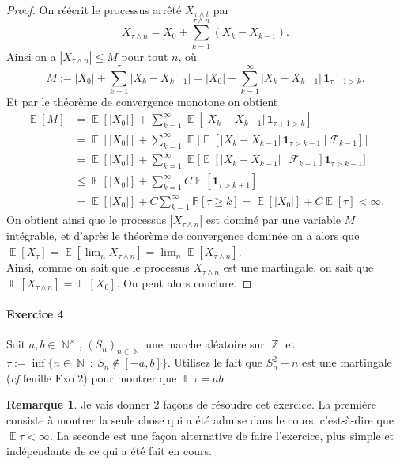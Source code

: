 \documentclass{article}
\theoremstyle{definition}
\newtheorem{rem}{Remarque}
\numberwithin{equation}{section}
\DeclareMathOperator{\Z}{\mathbb{Z}}
\DeclareMathOperator{\N}{\mathbb{N}}
\DeclareMathOperator{\E}{\mathbb{E}}
\begin{document}
\begin{proof}
On réécrit le processus arrêté $X_{\tau\wedge t}$ par 
$$X_{\tau\wedge n} = X_0 + \sum_{k=1}^{\tau\wedge n} (X_k-X_{k-1}).$$
Ainsi on a $|X_{\tau\wedge n}|\leq M$ pour tout $n$, où 
$$M:=|X_0| + \sum_{k=1}^\tau |X_k-X_{k-1}|=|X_0| + \sum_{k=1}^\infty |X_k-X_{k-1}| \, \mathbf{1}_{\tau+1>k}.$$
Et par le théorème de convergence monotone on obtient 
\begin{align*}
\E[M] &= \E[|X_0|] + \sum_{k=1}^\infty \E[|X_k-X_{k-1}|\,\mathbf{1}_{\tau+1>k}]\\
&= \E[|X_0|] + \sum_{k=1}^\infty \E\big[ \E[ |X_k-X_{k-1}|\,\mathbf{1}_{\tau>k-1}~|~\mathcal{F}_{k-1}] \big]\\
&= \E[|X_0|] + \sum_{k=1}^\infty \E\big[ \E[ |X_k-X_{k-1}|~|~\mathcal{F}_{k-1}] \mathbf{1}_{\tau>k-1} \big]\\
&\leq \E[|X_0|] + \sum_{k=1}^\infty C\E[ \mathbf{1}_{\tau>k+1} ]\\
&= \E[|X_0|] + C\sum_{k=1}^\infty \mathbb{P}[\tau\geq k] = \E[|X_0|] + C\E[\tau] < \infty.
\end{align*}
On obtient ainsi que le processus $|X_{\tau\wedge n}|$ est dominé par une variable $M$ intégrable, et d'après le théorème de convergence dominée on a alors que $\E[X_\tau]=\E[\lim_n X_{\tau\wedge n}] = \lim_n\E[X_{\tau\wedge n}]$.\\
Ainsi, comme on sait que le processus $X_{\tau\wedge n}$ est une martingale, on sait que $\E[X_{\tau\wedge n}]=\E[X_0]$. On peut alors conclure.
\end{proof}





\paragraph{Exercice 4}
Soit $a,b\in\N^\times$, $(S_n)_{n\in \N}$ une marche aléatoire sur $\Z$ et $\tau:=\inf\{n\in \N~:~S_n\notin[-a,b]\}$. Utilisez le fait que $S_n^2-n$ est une martingale (\textit{cf} feuille Exo 2) pour montrer que $\E \tau = ab$. 

\begin{rem}
Je vais donner 2 façons de résoudre cet exercice. La première consiste à montrer la seule chose qui a été admise dans le cours, c'est-à-dire que $\E\tau <\infty$. La seconde est une façon alternative de faire l'exercice, plus simple et indépendante de ce qui a été fait en cours.
\end{rem}
\end{document}
